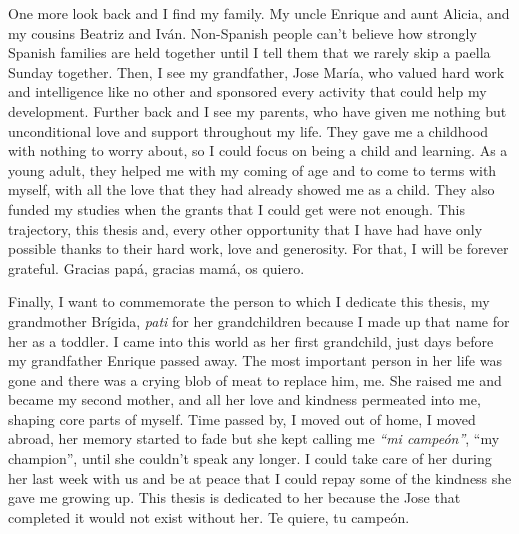 One more look back and I find my family. My uncle Enrique and aunt Alicia, and my cousins Beatriz and Iván. Non-Spanish people can't believe how strongly Spanish families are held together until I tell them that we rarely skip a paella Sunday together. Then, I see my grandfather, Jose María, who valued hard work and intelligence like no other and sponsored every activity that could help my development. Further back and I see my parents, who have given me nothing but unconditional love and support throughout my life. They gave me a childhood with nothing to worry about, so I could focus on being a child and learning. As a young adult, they helped me with my coming of age and to come to terms with myself, with all the love that they had already showed me as a child. They also funded my studies when the grants that I could get were not enough. This trajectory, this thesis and, every other opportunity that I have had have only possible thanks to their hard work, love and generosity. For that, I will be forever grateful. Gracias papá, gracias mamá, os quiero. 

Finally, I want to commemorate the person to which I dedicate this thesis, my grandmother Brígida, \textit{pati} for her grandchildren because I made up that name for her as a toddler. I came into this world as her first grandchild, just days before my grandfather Enrique passed away. The most important person in her life was gone and there was a crying blob of meat to replace him, me. She raised me and became my second mother, and all her love and kindness permeated into me, shaping core parts of myself. Time passed by, I moved out of home, I moved abroad, her memory started to fade but she kept calling me \textit{``mi campeón''}, ``my champion'', until she couldn't speak any longer. I could take care of her during her last week with us and be at peace that I could repay some of the kindness she gave me growing up. This thesis is dedicated to her because the Jose that completed it would not exist without her. Te quiere, tu campeón.